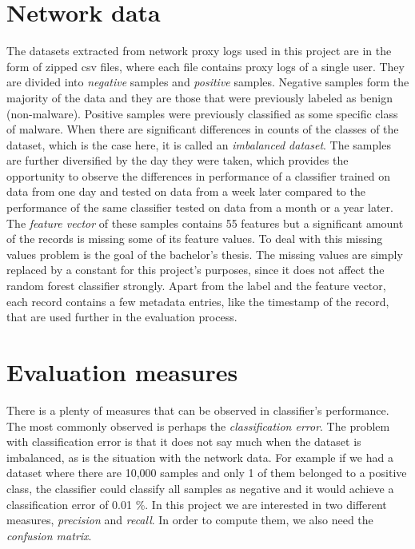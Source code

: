 \documentclass{article}
\begin{document}
  \section{Network data}
    The datasets extracted from network proxy logs used in this project are in the form of zipped csv files, where each file contains proxy logs of a single user. They are divided into {\it negative} samples and {\it positive} samples. Negative samples form the majority of the data and they are those that were previously labeled as benign (non-malware). Positive samples were previously classified as some specific class of malware. When there are significant differences in counts of the classes of the dataset, which is the case here, it is called an {\it imbalanced dataset}. The samples are further diversified by the day they were taken, which provides the opportunity to observe the differences in performance of a classifier trained on data from one day and tested on data from a week later compared to the performance of the same classifier tested on data from a month or a year later. The {\it feature vector} of these samples contains 55 features but a significant amount of the records is missing some of its feature values. To deal with this missing values problem is the goal of the bachelor's thesis. The missing values are simply replaced by a constant for this project's purposes, since it does not affect the random forest classifier strongly. Apart from the label and the feature vector, each record contains a few metadata entries, like the timestamp of the record, that are used further in the evaluation process.
  \newpage
  \section{Evaluation measures}
    There is a plenty of measures that can be observed in classifier's performance. The most commonly observed is perhaps the {\it classification error}. The problem with classification error is that it does not say much when the dataset is imbalanced, as is the situation with the network data. For example if we had a dataset where there are 10,000 samples and only 1 of them belonged to a positive class, the classifier could classify all samples as negative and it would achieve a classification error of 0.01 \%. In this project we are interested in two different measures, {\it precision} and {\it recall}. In order to compute them, we also need the {\it confusion matrix}.
\end{document}
